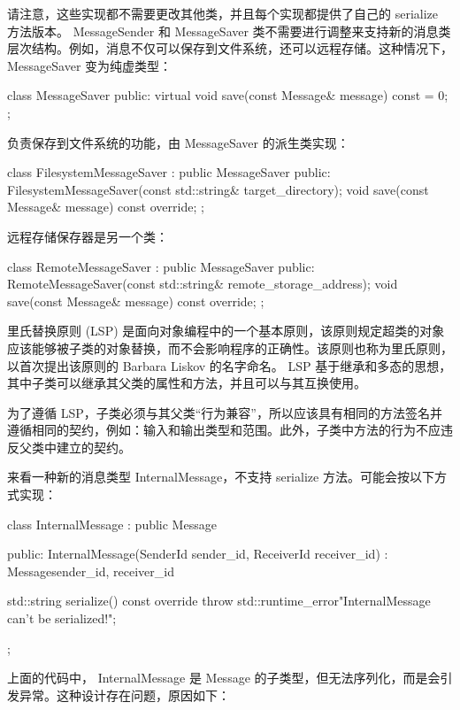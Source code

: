 请注意，这些实现都不需要更改其他类，并且每个实现都提供了自己的 serialize 方法版本。
MessageSender 和 MessageSaver 类不需要进行调整来支持新的消息类层次结构。例如，消息不仅可以保存到文件系统，还可以远程存储。这种情况下， MessageSaver 变为纯虚类型：

\begin{cpp}
class MessageSaver {
public:
    virtual void save(const Message& message) const = 0;
};
\end{cpp}

负责保存到文件系统的功能，由 MessageSaver 的派生类实现：

\begin{cpp}
class FilesystemMessageSaver : public MessageSaver {
    public:
    FilesystemMessageSaver(const std::string&
        target_directory);
    void save(const Message& message) const override;
};
\end{cpp}

远程存储保存器是另一个类：

\begin{cpp}
class RemoteMessageSaver : public MessageSaver {
public:
    RemoteMessageSaver(const std::string&
        remote_storage_address);
    void save(const Message& message) const override;
};
\end{cpp}


里氏替换原则 (LSP) 是面向对象编程中的一个基本原则，该原则规定超类的对象应该能够被子类的对象替换，而不会影响程序的正确性。该原则也称为里氏原则，以首次提出该原则的 Barbara Liskov 的名字命名。 LSP 基于继承和多态的思想，其中子类可以继承其父类的属性和方法，并且可以与其互换使用。

为了遵循 LSP，子类必须与其父类“行为兼容”，所以应该具有相同的方法签名并遵循相同的契约，例如：输入和输出类型和范围。此外，子类中方法的行为不应违反父类中建立的契约。

来看一种新的消息类型 InternalMessage，不支持 serialize 方法。可能会按以下方式实现：

\begin{cpp}
class InternalMessage : public Message {
public:
    InternalMessage(SenderId sender_id, ReceiverId
                    receiver_id)
        : Message{sender_id, receiver_id} {}

    std::string serialize() const override {
        throw std::runtime_error{"InternalMessage can't be
            serialized!"};
    }
};
\end{cpp}

上面的代码中， InternalMessage 是 Message 的子类型，但无法序列化，而是会引发异常。这种设计存在问题，原因如下：

